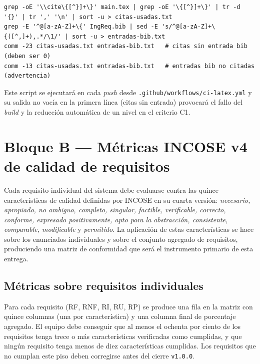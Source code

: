 \documentclass[11pt,a4paper]{article}
\begin{document}
\begin{lstlisting}
grep -oE '\\cite\{[^}]+\}' main.tex | grep -oE '\{[^}]+\}' | tr -d '{}' | tr ',' '\n' | sort -u > citas-usadas.txt
grep -E '^@[a-zA-Z]+\{' IngReq.bib | sed -E 's/^@[a-zA-Z]+\{([^,]+),.*/\1/' | sort -u > entradas-bib.txt
comm -23 citas-usadas.txt entradas-bib.txt   # citas sin entrada bib (deben ser 0)
comm -13 citas-usadas.txt entradas-bib.txt   # entradas bib no citadas (advertencia)
\end{lstlisting}

Este script se ejecutar\'a en cada \emph{push} desde \texttt{.github/workflows/ci-latex.yml} y su salida no vac\'ia en la primera l\'inea (citas sin entrada) provocar\'a el fallo del \emph{build} y la reducci\'on autom\'atica de un nivel en el criterio C1.

\section{Bloque B --- M\'etricas INCOSE v4 de calidad de requisitos}

Cada requisito individual del sistema debe evaluarse contra las quince caracter\'isticas de calidad definidas por INCOSE en su cuarta versi\'on: \emph{necesario, apropiado, no ambiguo, completo, singular, factible, verificable, correcto, conforme, expresado positivamente, apto para la abstracci\'on, consistente, comparable, modificable} y \emph{permitido}. La aplicaci\'on de estas caracter\'isticas se hace sobre los enunciados individuales y sobre el conjunto agregado de requisitos, produciendo una matriz de conformidad que ser\'a el instrumento primario de esta entrega.

\subsection{M\'etricas sobre requisitos individuales}

Para cada requisito (RF, RNF, RI, RU, RP) se produce una fila en la matriz con quince columnas (una por caracter\'istica) y una columna final de porcentaje agregado. El equipo debe conseguir que al menos el ochenta por ciento de los requisitos tenga trece o m\'as caracter\'isticas verificadas como cumplidas, y que ning\'un requisito tenga menos de diez caracter\'isticas cumplidas. Los requisitos que no cumplan este piso deben corregirse antes del cierre \texttt{v1.0.0}.
\end{document}
